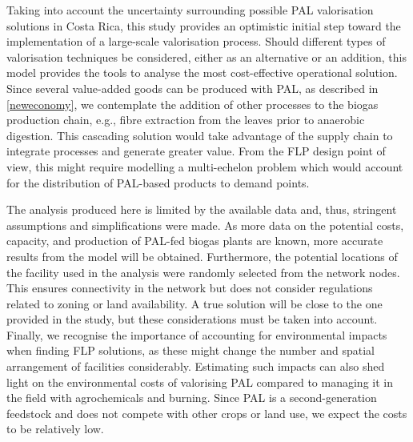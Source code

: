 Taking into account the uncertainty surrounding possible PAL valorisation solutions in Costa Rica, this study provides an optimistic initial step toward the implementation of a large-scale valorisation process. Should different types of valorisation techniques be considered, either as an alternative or an addition, this model provides the tools to analyse the most cost-effective operational solution. Since several value-added goods can be produced with PAL, as described in \cref{neweconomy}, we contemplate the addition of other processes to the biogas production chain, e.g., fibre extraction from the leaves prior to anaerobic digestion. This cascading solution would take advantage of the supply chain to integrate processes and generate greater value. From the FLP design point of view, this might require modelling a multi-echelon problem which would account for the distribution of PAL-based products to demand points. 

The analysis produced here is limited by the available data and, thus, stringent assumptions and simplifications were made. As more data on the potential costs, capacity, and production of PAL-fed biogas plants are known, more accurate results from the model will be obtained. Furthermore, the potential locations of the facility used in the analysis were randomly selected from the network nodes. This ensures connectivity in the network but does not consider regulations related to zoning or land availability. A true solution will be close to the one provided in the study, but these considerations must be taken into account. Finally, we recognise the importance of accounting for environmental impacts when finding FLP solutions, as these might change the number and spatial arrangement of facilities considerably. Estimating such impacts can also shed light on the environmental costs of valorising PAL compared to managing it in the field with agrochemicals and burning. Since PAL is a second-generation feedstock and does not compete with other crops or land use, we expect the costs to be relatively low.

